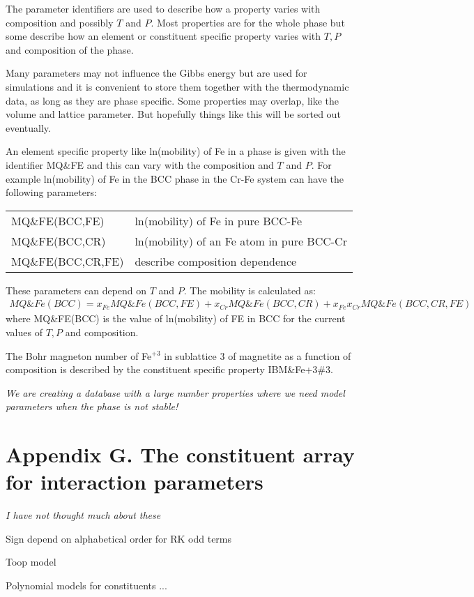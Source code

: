 \documentclass[12pt]{article}
\begin{document}

\bigskip

The parameter identifiers are used to describe how a property varies
with composition and possibly $T$ and $P$.  Most properties are for
the whole phase but some describe how an element or constituent
specific property varies with $T, P$ and composition of the phase.

Many parameters may not influence the Gibbs energy but are used for
simulations and it is convenient to store them together with the
thermodynamic data, as long as they are phase specific.  Some
properties may overlap, like the volume and lattice parameter.  But
hopefully things like this will be sorted out eventually.

An element specific property like ln(mobility) of Fe in a phase is
given with the identifier MQ\&FE and this can vary with the
composition and $T$ and $P$.  For example ln(mobility) of Fe in the
BCC phase in the Cr-Fe system can have the following parameters:

\begin{tabular}{ll}
MQ\&FE(BCC,FE) & ln(mobility) of Fe in pure BCC-Fe\\
MQ\&FE(BCC,CR) & ln(mobility) of an Fe atom in pure BCC-Cr\\
MQ\&FE(BCC,CR,FE) & describe composition dependence\\
\end{tabular}

These parameters can depend on $T$ and $P$.  The mobility is
calculated as:
{\small
\begin{eqnarray}
MQ\&Fe(BCC) = x_{Fe}MQ\&Fe(BCC,FE)+x_{Cr}MQ\&Fe(BCC,CR)+x_{Fe}x_{Cr}MQ\&Fe(BCC,CR,FE)
\end{eqnarray}}
where MQ\&FE(BCC) is the value of ln(mobility) of FE in BCC for the
current values of $T, P$ and composition.

The Bohr magneton number of Fe$^{+3}$ in sublattice 3 of magnetite as
a function of composition is described by the constituent specific
property IBM\&Fe+3\#3.

{\em We are creating a database with a large number properties where we
need model parameters when the phase is not stable!}

\newpage

\section{Appendix G.  The constituent array for interaction parameters}

{\em I have not thought much about these}

Sign depend on alphabetical order for RK odd terms

Toop model

Polynomial models for constituents ...
\end{document}
